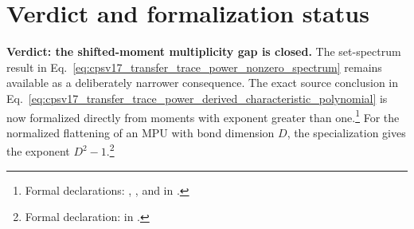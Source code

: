 \documentclass{article}
\begin{document}
\section{Verdict and formalization status}

\textbf{Verdict: the shifted-moment multiplicity gap is closed.}
The set-spectrum result in
Eq.~\ref{eq:cpsv17_transfer_trace_power_nonzero_spectrum} remains available
as a deliberately narrower consequence. The exact source conclusion in
Eq.~\ref{eq:cpsv17_transfer_trace_power_derived_characteristic_polynomial} is
now formalized directly from moments with exponent greater than
one.\footnote{Formal declarations:
,
,
and
in .}
For the normalized flattening of an MPU with bond dimension $D$, the
specialization gives the exponent $D^2-1$.\footnote{Formal declaration:
 in
.}



\end{document}
